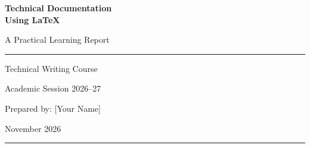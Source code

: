 \documentclass[12pt,a4paper]{article}
\begin{document}
\begin{titlepage}
    \centering

    \vspace*{2cm}

    {\Huge\bfseries Technical Documentation\\[0.3cm]
    Using LaTeX\par}

    \vspace{1.5cm}

    {\Large A Practical Learning Report\par}

    \vspace{2cm}

    \rule{\textwidth}{0.5pt}

    \vspace{1cm}

    {\large Technical Writing Course\par}

    \vspace{0.5cm}

    {\large Academic Session 2026--27\par}

    \vspace{1cm}

    {\large Prepared by: [Your Name]\par}

    \vfill

    {\large November 2026\par}

    \rule{\textwidth}{0.5pt}

\end{titlepage}

\begin{abstract}
LaTeX is a powerful document preparation system widely
used for creating academic papers, technical reports,
research articles, and mathematical documents.

This report explores the fundamentals of LaTeX, its
document structure, commonly used commands, mathematical
expressions, tables, figures, and referencing techniques.
It also highlights the importance of LaTeX in producing
professional and well-organized technical documentation.
\end{abstract}

\newpage

\tableofcontents
\newpage

\end{document}
